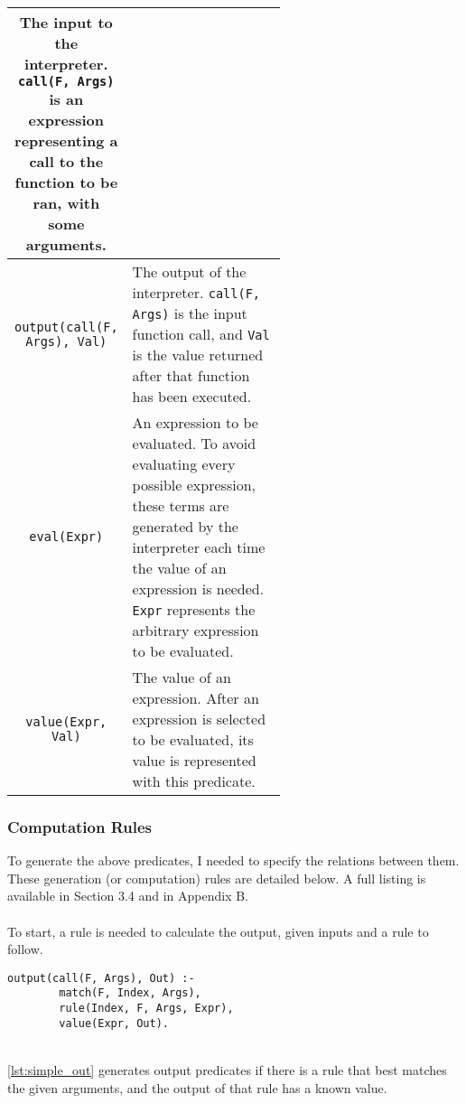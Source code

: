 \begin{longtable}[c]{| c | m{0.6\linewidth} |}
The input to the interpreter. \lstinline!call(F, Args)! is an expression representing a call to the function to be ran, with some arguments. \newline
\\
\hline
\lstinline!output(call(F, Args), Val)! 
& 
\mbox{}\newline
The output of the interpreter. \lstinline!call(F, Args)! is the input function call, and \lstinline!Val! is the value returned after that function has been executed. \newline
\\
\hline
\lstinline!eval(Expr)! 
& 
\mbox{}\newline
An expression to be evaluated. To avoid evaluating every possible expression, these terms are generated by the interpreter each time the value of an expression is needed. \newline
\lstinline!Expr! represents the arbitrary expression to be evaluated. \newline 
\\
\hline
\lstinline!value(Expr, Val)! 
& 
\mbox{}\newline
The value of an expression. After an expression is selected to be evaluated, its value is represented with this predicate.\newline 
\\
\hline
\end{longtable}
 
\subsubsection{Computation Rules}
To generate the above predicates, I needed to specify the relations between them. These generation (or computation) rules are detailed below. A full listing is available in Section 3.4 and in Appendix B.\\ \\
To start, a rule is needed to calculate the output, given inputs and a rule to follow. \\

\begin{lstlisting}[caption={Output generation}, label={lst:simple_out}, firstnumber=55]
output(call(F, Args), Out) :- 
		match(F, Index, Args), 
		rule(Index, F, Args, Expr), 
		value(Expr, Out).	
\end{lstlisting}
\mbox{} \\
\ref{lst:simple_out} generates output predicates if there is a rule that best matches the given arguments, and the output of that rule has a known value. \\

